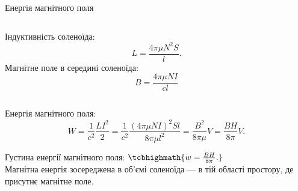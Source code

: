 \documentclass[onlytextwidth]{beamer}
\begin{document}
\begin{frame}{Енергія магнітного поля}{}
\begin{onlyenv}
\begin{columns}
\begin{column}{0.75\linewidth}
\begin{block}{}
					Індуктивність соленоїда:
					\begin{equation*}
						L= \frac{4\pi\mu N^2 S}{l}.
					\end{equation*}
					Магнітне поле в середині соленоїда:
					\begin{equation*}
						B = \dfrac{4\pi\mu NI}{c l}
					\end{equation*}
				\end{block}
			\end{column}
		\end{columns}
	\end{onlyenv}
	\begin{overprint}
		\begin{block}{}\justifying
			Енергія магнітного поля:
			\begin{equation*}
				W =  \frac1{c^2}\frac{LI^2}{2} = \frac1{c^2}\frac{(4\pi\mu N I)^2 S l }{ 8\pi\mu l^2} = \frac{B^2}{8\pi\mu} V = \frac{BH}{8\pi}
				V.
			\end{equation*}
		\end{block}
		\begin{block}{}\justifying
			Густина енергії магнітного поля:
			\(
			\tcbhighmath{w =  \frac{BH}{8\pi}.}
			\)\\[1ex]
			\alert{Магнітна енергія зосереджена в об'ємі соленоїда --- в тій області простору, де присутнє магнітне поле}.
		\end{block}
	\end{overprint}
\end{frame}
\end{document}
